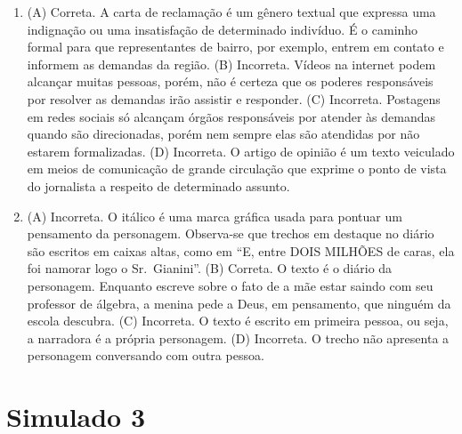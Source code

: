 \begin{enumerate}
\item (A) Correta. A carta de reclamação é um gênero textual que expressa uma
indignação ou uma insatisfação de determinado indivíduo. É o caminho
formal para que representantes de bairro, por exemplo, entrem em contato
e informem as demandas da região.
(B) Incorreta. Vídeos na internet podem alcançar muitas pessoas, porém,
não é certeza que os poderes responsáveis por resolver as demandas irão
assistir e responder.
(C) Incorreta. Postagens em redes sociais só alcançam órgãos responsáveis
por atender às demandas quando são direcionadas, porém nem sempre elas
são atendidas por não estarem formalizadas.
(D) Incorreta. O artigo de opinião é um texto veiculado em meios de
comunicação de grande circulação que exprime o ponto de vista do
jornalista a respeito de determinado assunto.

\item (A) Incorreta. O itálico é uma marca gráfica usada para pontuar um
pensamento da personagem. Observa-se que trechos em destaque no diário
são escritos em caixas altas, como em ``E, entre DOIS MILHÕES de caras,
ela foi namorar logo o Sr.~Gianini''.
(B) Correta. O texto é o diário da personagem. Enquanto escreve sobre o
fato de a mãe estar saindo com seu professor de álgebra, a menina pede a
Deus, em pensamento, que ninguém da escola descubra.
(C) Incorreta. O texto é escrito em primeira pessoa, ou seja, a narradora
é a própria personagem.
(D) Incorreta. O trecho não apresenta a personagem conversando com outra
pessoa.
\end{enumerate}

\section*{Simulado 3}

